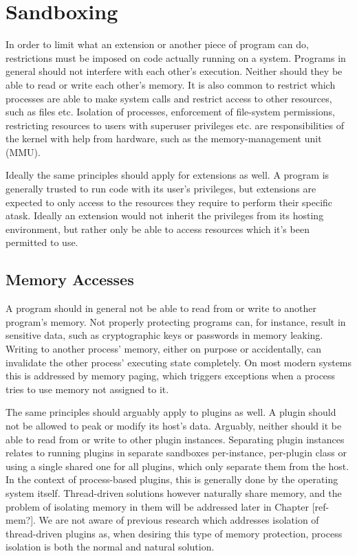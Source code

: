 \chapter {Sandboxing}

In order to limit what an extension or another piece of program can do,
restrictions must be imposed on code actually running on a system.
Programs in general should not interfere with each other's execution.
Neither should they be able to read or write each other's memory.
It is also common to restrict which processes are able to make system calls and
restrict access to other resources, such as files etc.
Isolation of processes, enforcement of file-system permissions, restricting
resources to users with superuser privileges etc. are responsibilities of the
kernel with help from hardware, such as the memory-management unit (MMU).

Ideally the same principles should apply for extensions as well.
A program is generally trusted to run code with its user's privileges, but
extensions are expected to only access to the resources they require to perform
their specific atask. Ideally an extension would not inherit the privileges from
its hosting environment, but rather only be able to access resources which it's
been permitted to use.


\section {Memory Accesses}

A program should in general not be able to read from or write to another
program's memory.
Not properly protecting programs can, for instance, result in sensitive data,
such as cryptographic keys or passwords in memory leaking.
Writing to another process' memory, either on purpose or accidentally, can
invalidate the other process' executing state completely.
On most modern systems this is addressed by memory paging, which triggers
exceptions when a process tries to use memory not assigned to it.

The same principles should arguably apply to plugins as well.
A plugin should not be allowed to peak or modify its host's data.
Arguably, neither should it be able to read from or write to other plugin
instances.
Separating plugin instances relates to running plugins in separate sandboxes
per-instance, per-plugin class or using a single shared one for all plugins,
which only separate them from the host.
In the context of process-based plugins, this is generally done by the operating
system itself.
Thread-driven solutions however naturally share memory, and the problem of
isolating memory in them will be addressed later in Chapter [ref-mem?].
We are not aware of previous research which addresses isolation of thread-driven
plugins as, when desiring this type of memory protection, process isolation is
both the normal and natural solution.


